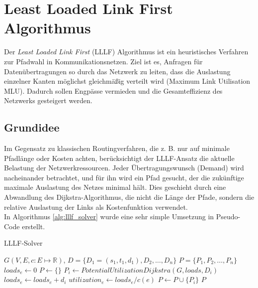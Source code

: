 \chapter{Least Loaded Link First Algorithmus}
\label{chapter:algorithmus1}

Der \textit{Least Loaded Link First} (LLLF) Algorithmus ist ein heuristisches Verfahren zur Pfadwahl in Kommunikationsnetzen. Ziel ist es, Anfragen für Datenübertragungen so durch das Netzwerk zu leiten, dass die Auslastung einzelner Kanten möglichst gleichmäßig verteilt wird (Maximum Link Utilisation MLU). Dadurch sollen Engpässe vermieden und die Gesamteffizienz des Netzwerks gesteigert werden.

\section{Grundidee}
    Im Gegensatz zu klassischen Routingverfahren, die z. B. nur auf minimale Pfadlänge oder Kosten achten, berücksichtigt der LLLF-Ansatz die aktuelle Belastung der Netzwerkressourcen. Jeder Übertragungswunsch (Demand) wird nacheinander betrachtet, und für ihn wird ein Pfad gesucht, der die zukünftige maximale Auslastung des Netzes minimal hält. Dies geschieht durch eine Abwandlung des Dijkstra-Algorithmus, die nicht die Länge der Pfade, sondern die relative Auslastung der Links als Kostenfunktion verwendet. \\
    In Algorithmus \ref{alg:lllf_solver} wurde eine sehr simple Umsetzung in Pseudo-Code erstellt.
    
    \begin{algorithm}[H]
        \caption{LLLF-Solver}
        \label{alg:lllf_solver}
        \begin{algorithmic}[1]
            \Require $G(V,E,c:E\mapsto\mathbb{R})$, $D=\{ D_1=(s_1,t_1,d_1), D_2, \dots, D_n \}$
            \Ensure $P=\{P_1, P_2, \dots, P_n\}$
                \State $loads_e \gets 0$
            \EndFor
            \State $P \gets \{\}$
                \State $P_i \gets PotentialUtilizationDijkstra(G, loads, D_i)$
                    \State $loads_e \gets loads_e + d_i$
                    \State $utilization_e \gets loads_e / c(e)$
                \EndFor
                \State $P \gets P \cup \{P_i\}$
            \EndFor
            \State \Return $P$
        \end{algorithmic}
    \end{algorithm}

